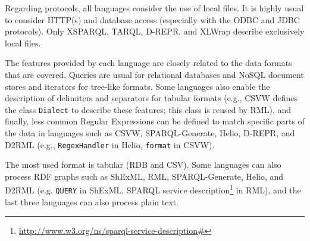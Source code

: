 Regarding protocols, all languages consider the use of local files. It is highly usual to consider HTTP(s) and database access (especially with the ODBC and JDBC protocols). Only XSPARQL, TARQL, D-REPR, and XLWrap describe exclusively local files. 

The features provided by each language are closely related to the data formats that are covered. Queries are usual for relational databases and NoSQL document stores and iterators for tree-like formats. Some languages also enable the description of delimiters and separators for tabular formats (e.g., CSVW defines the class \texttt{Dialect} to describe these features; this class is reused by RML), and finally, less common Regular Expressions can be defined to match specific parts of the data in languages such as CSVW, SPARQL-Generate, Helio, D-REPR, and D2RML (e.g., \texttt{RegexHandler} in Helio, \texttt{format} in CSVW). 

The most used format is tabular (RDB and CSV). Some languages can also process RDF graphs such as ShExML, RML, SPARQL-Generate, Helio, and D2RML (e.g. \texttt{QUERY} in ShExML,  SPARQL service description\footnote{\url{http://www.w3.org/ns/sparql-service-description\#}} in RML), and the last three languages can also process plain text.








